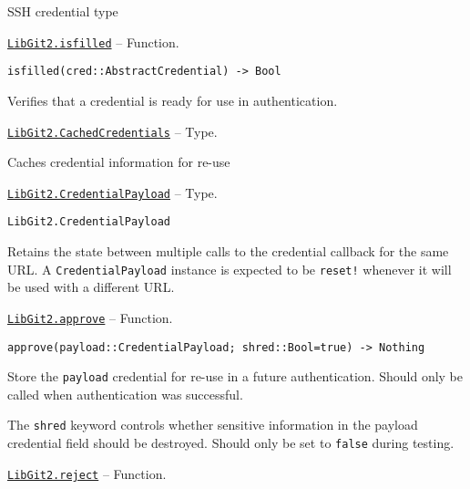 \begin{adjustwidth}{2em}{0pt}

SSH credential type



\end{adjustwidth}
\hypertarget{10844720204154576193}{} 
\hyperlink{10844720204154576193}{\texttt{LibGit2.isfilled}}  -- {Function.}

\begin{adjustwidth}{2em}{0pt}


\begin{verbatim}
isfilled(cred::AbstractCredential) -> Bool
\end{verbatim}

Verifies that a credential is ready for use in authentication.



\end{adjustwidth}
\hypertarget{8879321221473200614}{} 
\hyperlink{8879321221473200614}{\texttt{LibGit2.CachedCredentials}}  -- {Type.}

\begin{adjustwidth}{2em}{0pt}

Caches credential information for re-use



\end{adjustwidth}
\hypertarget{10030132349633212983}{} 
\hyperlink{10030132349633212983}{\texttt{LibGit2.CredentialPayload}}  -- {Type.}

\begin{adjustwidth}{2em}{0pt}


\begin{verbatim}
LibGit2.CredentialPayload
\end{verbatim}

Retains the state between multiple calls to the credential callback for the same URL. A \texttt{CredentialPayload} instance is expected to be \texttt{reset!} whenever it will be used with a different URL.



\end{adjustwidth}
\hypertarget{15851737231324263444}{} 
\hyperlink{15851737231324263444}{\texttt{LibGit2.approve}}  -- {Function.}

\begin{adjustwidth}{2em}{0pt}


\begin{verbatim}
approve(payload::CredentialPayload; shred::Bool=true) -> Nothing
\end{verbatim}

Store the \texttt{payload} credential for re-use in a future authentication. Should only be called when authentication was successful.

The \texttt{shred} keyword controls whether sensitive information in the payload credential field should be destroyed. Should only be set to \texttt{false} during testing.



\end{adjustwidth}
\hypertarget{17184615468062555134}{} 
\hyperlink{17184615468062555134}{\texttt{LibGit2.reject}}  -- {Function.}


